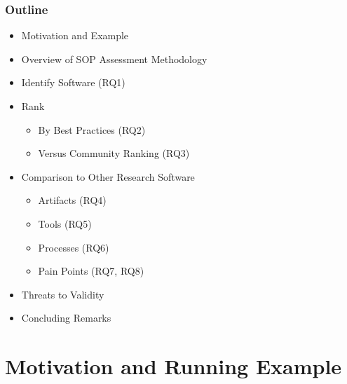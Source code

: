 \documentclass[usenames,dvipsnames]{beamer}
\begin{document}
\begin{frame}

\frametitle{Outline}

\begin{itemize}
  \item Motivation and Example
  \item Overview of SOP Assessment Methodology
  \item Identify Software (RQ1)
  \item Rank
  \begin{itemize}
  \item By Best Practices (RQ2)
  \item Versus Community Ranking (RQ3)
  \end{itemize}
  \item Comparison to Other Research Software
  \begin{itemize}
  \item Artifacts (RQ4)
  \item Tools (RQ5)
  \item Processes (RQ6)
  \item Pain Points (RQ7, RQ8)
  \end{itemize}
  \item Threats to Validity
  \item Concluding Remarks
\end{itemize}

  
\end{frame}


\section[Motivation]{Motivation and Running Example}

\end{document}

